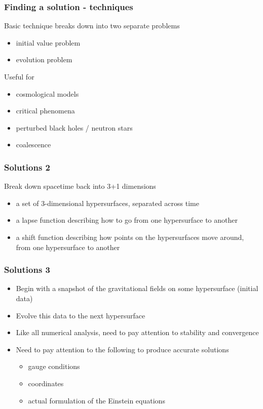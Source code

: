 \documentclass{beamer}
\begin{document}
\begin{frame}
  \frametitle{Finding a solution - techniques}
  Basic technique breaks down into two separate problems
  \begin{itemize}
    \item initial value problem
    \item evolution problem
  \end{itemize}
  Useful for
  \begin{itemize}
    \item cosmological models
    \item critical phenomena
    \item perturbed black holes / neutron stars
    \item coalescence
  \end{itemize}
\end{frame}

\begin{frame}
  \frametitle{Solutions 2}
  Break down spacetime back into 3+1 dimensions
  \begin{itemize}
    \item a set of 3-dimensional hypersurfaces, separated across time
    \item a lapse function describing how to go from one hypersurface to another
    \item a shift function describing how points on the hypersurfaces move around, from one hypersurface to another
  \end{itemize}
\end{frame}

\begin{frame}
  \frametitle{Solutions 3}
  \begin{itemize}
    \item Begin with a snapshot of the gravitational fields on some hypersurface (initial data)
    \item Evolve this data to the next hypersurface
    \item Like all numerical analysis, need to pay attention to stability and convergence
    \item Need to pay attention to the following to produce accurate solutions
    \begin{itemize}
      \item gauge conditions
      \item coordinates
      \item actual formulation of the Einstein equations
    \end{itemize}
  \end{itemize}
\end{frame}
\end{document}
